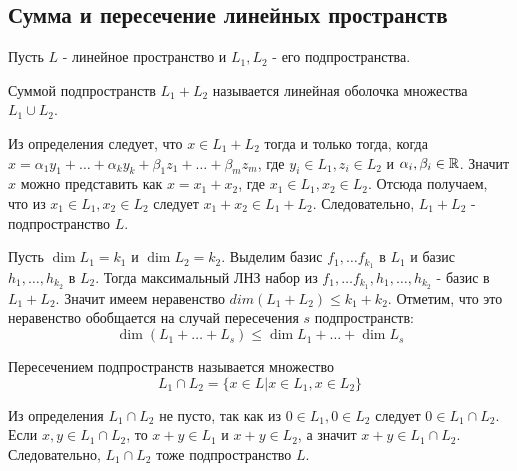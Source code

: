 \subsection{Сумма и пересечение линейных пространств}
Пусть $L$ - линейное пространство и $L_1, L_2$ - его подпространства.
\begin{definition}
    Суммой подпространств $L_1+L_2$ называется линейная оболочка множества $L_1 \cup L_2$. 
\end{definition}
Из определения следует, что $x \in L_1+L_2$ тогда и только тогда, когда $x=\alpha_1 y_1+ \dots+ \alpha_k y_k + \beta_1 z_1 + \dots + \beta_m z_m$, где $y_i \in L_1, z_i \in L_2$ и $\alpha_i, \beta_i \in \mathbb{R}$. Значит $x$ можно представить как $x=x_1+x_2$, где $x_1 \in L_1, x_2 \in L_2$. Отсюда получаем, что из  $x_1 \in L_1, x_2 \in L_2$ следует $x_1+x_2\in L_1 + L_2$. Следовательно, $L_1+L_2$ - подпространство $L$.

Пусть $\dim{L_1}=k_1$ и $\dim{L_2}=k_2$. Выделим базис $f_1, \dots f_{k_1}$ в $L_1$ и базис $h_1, \dots, h_{k_2}$ в $L_2$. Тогда максимальный ЛНЗ набор из $f_1, \dots f_{k_1}, h_1, \dots, h_{k_2}$ - базис в $L_1+L_2$. Значит имеем неравенство $dim(L_1+L_2)\leqslant k_1+k_2$. Отметим, что это неравенство обобщается на случай пересечения $s$ подпространств:
\begin{equation*}
\label{dim_inequality}
    \dim{(L_1+\dots +L_s)}\leqslant \dim{L_1}+\dots+\dim{L_s}
\end{equation*}

\begin{definition}
    Пересечением подпространств называется множество  \[L_1 \cap L_2=\{x\in L |x\in L_1, x\in L_2\}\]
\end{definition}
Из определения $L_1 \cap L_2$ не пусто, так как из $0 \in L_1, 0 \in L_2$ следует $0\in L_1 \cap L_2$.
Если $x, y \in L_1 \cap L_2$, то $x+y \in L_1$ и $x+y \in L_2$, а значит $x+y \in L_1 \cap L_2$. Следовательно, $L_1 \cap L_2$ тоже подпространство $L$.

